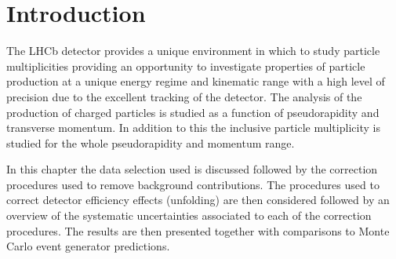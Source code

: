 \section{Introduction}
\label{section: multiplicity introduction}

The LHCb detector provides a unique environment in which to study particle multiplicities providing an opportunity to investigate properties of particle production at a unique energy regime and kinematic range with a high level of precision due to the excellent tracking of the detector. The analysis of the production of charged particles is studied as a function of pseudorapidity and transverse momentum. In addition to this the inclusive particle multiplicity is studied for the whole pseudorapidity and momentum range.


In this chapter the data selection used is discussed followed by the correction procedures used to remove background contributions. The procedures used to correct detector efficiency effects (unfolding) are then considered followed by an overview of the systematic uncertainties associated to each of the correction procedures. The results are then presented together with comparisons to Monte Carlo event generator predictions. %
